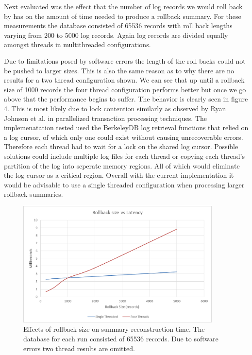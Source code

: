 \documentclass{article}
\begin{document}
Next evaluated was the effect that the number of log records we would roll back by has on the amount of time needed to produce a rollback summary. For these measurements the database consisted of 65536 records with roll back lengths varying from 200 to 5000 log records. Again log records are divided equally amongst threads in multithreaded configurations.

Due to limitations posed by software errors the length of the roll backs could not be pushed to larger sizes. This is also the same reason as to why there are no results for a two thread configuration shown. We can see that up until a rollback size of 1000 records the four thread configuration performs better but once we go above that the performance begins to suffer. The behavior is clearly seen in figure 4. This is most likely due to lock contention similarly as observed by Ryan Johnson et al. in parallelized transaction processing techniques\cite{transaction}. The implemenatation tested used the BerkeleyDB log retrieval functions that relied on a log cursor, of which only one could exist without causing unrecoverable errors. Therefore each thread had to wait for a lock on the shared log cursor. Possible solutions could include multiple log files for each thread or copying each thread's partition of the log into seperate memory regions. All of which would eliminate the log cursor as a critical region. Overall with the current implementation it would be advisable to use a single threaded configuration when processing larger rollback summaries.  

\begin{figure}
    \centering
    \includegraphics[height=2.5in]{sizevslatency.png}
    \caption{Effects of rollback size on summary reconstruction time. The database for each run consisted of 65536 records. Due to software errors two thread results are omitted.}
    \label{fig:RollbackSize}
\end{figure}
\end{document}

